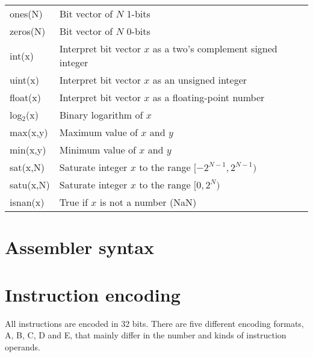 \begin{tabular}{lp{170pt}}
ones(N) & Bit vector of $N$ 1-bits \\
zeros(N) & Bit vector of $N$ 0-bits \\
int(x) & Interpret bit vector $x$ as a two's complement signed integer \\
uint(x) & Interpret bit vector $x$ as an unsigned integer \\
float(x) & Interpret bit vector $x$ as a floating-point number \\
log$_{2}$(x) & Binary logarithm of $x$ \\
max(x,y) & Maximum value of $x$ and $y$ \\
min(x,y) & Minimum value of $x$ and $y$ \\
sat(x,N) & Saturate integer $x$ to the range $[-2^{N-1},2^{N-1})$ \\
satu(x,N) & Saturate integer $x$ to the range $[0,2^{N})$ \\
isnan(x) & True if $x$ is not a number (NaN) \\
\end{tabular}

\section{Assembler syntax}

\tbd

\section{Instruction encoding}

All instructions are encoded in 32 bits. There are five different encoding
formats, A, B, C, D and E, that mainly differ in the number and kinds of
instruction operands.

